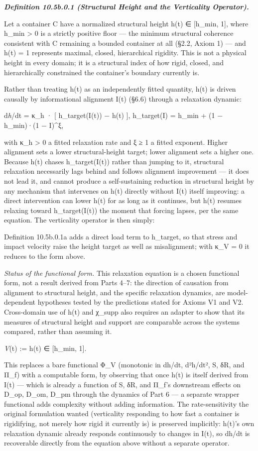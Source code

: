 \documentclass[
]{article}
\begin{document}
\emph{\textbf{Definition 10.5b.0.1 (Structural Height and the
Verticality Operator).}}

Let a container C have a normalized structural height h(t) ∈ {[}h\_min,
1{]}, where h\_min \textgreater{} 0 is a strictly positive floor --- the
minimum structural coherence consistent with C remaining a bounded
container at all (§2.2, Axiom 1) --- and h(t) = 1 represents maximal,
closed, hierarchical rigidity. This is not a physical height in every
domain; it is a structural index of how rigid, closed, and
hierarchically constrained the container's boundary currently is.

Rather than treating h(t) as an independently fitted quantity, h(t) is
driven causally by informational alignment I(t) (§6.6) through a
relaxation dynamic:

d\emph{h}/dt = κ\_h · {[} h\_target(I(t)) − h(t) {]}, h\_target(I) =
h\_min + (1 − h\_min)·(1 − I)\^{}ξ,

with κ\_h \textgreater{} 0 a fitted relaxation rate and ξ ≥ 1 a fitted
exponent. Higher alignment sets a lower structural-height target; lower
alignment sets a higher one. Because h(t) chases h\_target(I(t)) rather
than jumping to it, structural relaxation necessarily lags behind and
follows alignment improvement --- it does not lead it, and cannot
produce a self-sustaining reduction in structural height by any
mechanism that intervenes on h(t) directly without I(t) itself
improving: a direct intervention can lower h(t) for as long as it
continues, but h(t) resumes relaxing toward h\_target(I(t)) the moment
that forcing lapses, per the same equation. The verticality operator is
then simply:

Definition 10.5b.0.1a adds a direct load term to h\_target, so that
stress and impact velocity raise the height target as well as
misalignment; with κ\_V = 0 it reduces to the form above.

\emph{Status of the functional form.} This relaxation equation is a
chosen functional form, not a result derived from Parts 4--7: the
direction of causation from alignment to structural height, and the
specific relaxation dynamics, are model-dependent hypotheses tested by
the predictions stated for Axioms V1 and V2. Cross-domain use of h(t)
and χ\_supp also requires an adapter to show that its measures of
structural height and support are comparable across the systems
compared, rather than assuming it.

\emph{V}(t) := h(t) ∈ {[}h\_min, 1{]}.

This replaces a bare functional Φ\_V (monotonic in dh/dt, d²h/dt², S,
δR, and Π\_f) with a computable form, by observing that once h(t) is
itself derived from I(t) --- which is already a function of S, δR, and
Π\_f's downstream effects on D\_op, D\_om, D\_pm through the dynamics of
Part 6 --- a separate wrapper functional adds complexity without adding
information. The rate-sensitivity the original formulation wanted
(verticality responding to how fast a container is rigidifying, not
merely how rigid it currently is) is preserved implicitly: h(t)'s own
relaxation dynamic already responds continuously to changes in I(t), so
dh/dt is recoverable directly from the equation above without a separate
operator.
\end{document}
